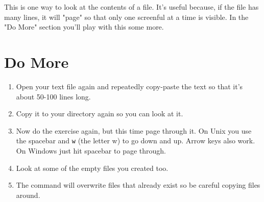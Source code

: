 This is one way to look at the contents of a file.  It's useful because, if the
file has many lines, it will "page" so that only one screenful at a time
is visible.  In the "Do More" section you'll play with this some more.


\section{Do More}

\begin{enumerate}
\item Open your text file again and repeatedly copy-paste the text so that it's about 50-100 lines long.
\item Copy it to your  directory again so you can look at it.
\item Now do the exercise again, but this time page through it.  On Unix you use
    the spacebar and \verb|w| (the letter w) to go down and up.  Arrow keys also work. On Windows just hit spacebar to page through.
\item Look at some of the empty files you created too.
\item The  command will overwrite files that already exist so be
    careful copying files around.
\end{enumerate}

